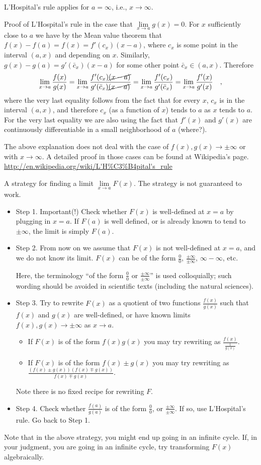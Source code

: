 \documentclass[12pt]{book}
\begin{document}
L'Hospital's rule applies for $a=\infty$, i.e., $x\to \infty$.

Proof of L'Hospital's rule in the case that $\lim\limits_{x\to a}g(x)=0 $. For $x$ sufficiently close to $a$ we have by the Mean value theorem that $f(x)-f(a)=f(x)=  f'(c_x) (x-a) $, where $c_x$ is some point in the interval $(a,x)$ and depending on $x$. Similarly, $g(x)- g(a)= g'(\bar c_x)(x-a)$ for some other point $\bar c_x\in (a,x)$. Therefore
\[
\lim\limits_{x\to a}\frac{f(x)}{g(x)}=\lim\limits_{x\to a}\frac{f'(c_x) \cancel{(x-a)}}{ g'(\bar c_x)\cancel{(x-a)}} = \lim\limits_{x\to a}\frac{f'(c_x) }{ g'(\bar c_x)}=\lim\limits_{x\to a}\frac{f'(x) }{ g'(x)}\quad ,
\]
where the very last equality follows from the fact that for every $x$, $c_x$ is in the interval $(a,x)$, and therefore $c_x$ (as a function of $x$) tends to $a$ as $x$ tends to $a$. For the very last equality we are also using the fact that $f'(x)$ and $g'(x)$ are continuously differentiable in a small neighborhood of $a$ (where?).

The above explanation does not deal with the case of $f(x), g(x)\to\pm \infty $ or with $x\to \infty$. A detailed proof in those cases can be found at Wikipedia's page.
\url{http://en.wikipedia.org/wiki/L'H%C3%B4pital's_rule}

A strategy for finding a limit $\lim\limits_{x\to a}F(x)$. The strategy is not guaranteed to work.
\begin{itemize}
\item Step 1. Important(!) Check whether $F(x)$ is well-defined at $x=a$ by plugging in $x=a$. If $F(a)$ is well defined, or is already known to tend to $\pm \infty$, the limit is simply $F(a)$.
\item Step 2. From now on we assume that $F(x)$ is not well-defined at $x=a$, and we do not know its limit. $F(x)$ can be of the form $\frac{0}{0}$, $\frac{\pm \infty }{\pm \infty}$, $ \infty-\infty$, etc.

Here, the terminology ``of the form $\frac{0}{0}$ or $\frac{\pm\infty}{\pm \infty}$'' is used colloquially; such wording should be avoided in scientific texts (including the natural sciences).
\item Step 3. Try to rewrite $F(x)$ as a quotient of two functions $\frac{f(x)}{g(x)}$ such that $f(x)$ and $g(x)$ are well-defined, or have known limits $f(x), g(x)\to \pm \infty$ as $x\to a$.
\begin{itemize}
\item If $F(x)$ is of the form $f(x)g(x)$ you may try rewriting as $\frac{f(x)}{\frac{1}{g(x)}}$.
\item If $F(x)$ is of the form $f(x)\pm g(x)$ you may try rewriting as $\frac{(f(x)\pm g(x))(f(x)\mp g(x))}{f(x)\mp g(x)}$.
\end{itemize}
Note there is no fixed recipe for rewriting $F$.
\item Step 4. Check whether $\frac{f(a)}{g(a)}$ is of the form $\frac{0}{0}$, or $\frac{\pm\infty}{\pm \infty}$. If so, use L'Hospital's rule. Go back to Step 1.
\end{itemize}
Note that in the above strategy, you might end up going in an infinite cycle. If, in your judgment, you are going in an infinite cycle, try transforming $F(x)$ algebraically.
\end{document}
